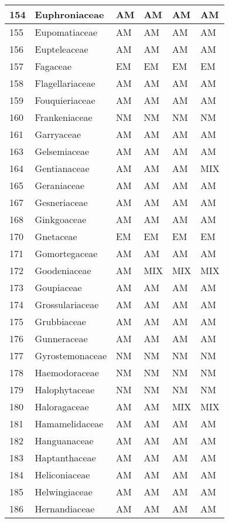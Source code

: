 \documentclass[]{article}
\begin{document}
\begin{longtable}{l|l|l|l|l|l}
\hline
154 & Euphroniaceae & AM & AM & AM & AM\\
\hline
155 & Eupomatiaceae & AM & AM & AM & AM\\
\hline
156 & Eupteleaceae & AM & AM & AM & AM\\
\hline
157 & Fagaceae & EM & EM & EM & EM\\
\hline
158 & Flagellariaceae & AM & AM & AM & AM\\
\hline
159 & Fouquieriaceae & AM & AM & AM & AM\\
\hline
160 & Frankeniaceae & NM & NM & NM & NM\\
\hline
161 & Garryaceae & AM & AM & AM & AM\\
\hline
163 & Gelsemiaceae & AM & AM & AM & AM\\
\hline
164 & Gentianaceae & AM & AM & AM & MIX\\
\hline
165 & Geraniaceae & AM & AM & AM & AM\\
\hline
167 & Gesneriaceae & AM & AM & AM & AM\\
\hline
168 & Ginkgoaceae & AM & AM & AM & AM\\
\hline
170 & Gnetaceae & EM & EM & EM & EM\\
\hline
171 & Gomortegaceae & AM & AM & AM & AM\\
\hline
172 & Goodeniaceae & AM & MIX & MIX & MIX\\
\hline
173 & Goupiaceae & AM & AM & AM & AM\\
\hline
174 & Grossulariaceae & AM & AM & AM & AM\\
\hline
175 & Grubbiaceae & AM & AM & AM & AM\\
\hline
176 & Gunneraceae & AM & AM & AM & AM\\
\hline
177 & Gyrostemonaceae & NM & NM & NM & NM\\
\hline
178 & Haemodoraceae & NM & NM & NM & NM\\
\hline
179 & Halophytaceae & NM & NM & NM & NM\\
\hline
180 & Haloragaceae & AM & AM & MIX & MIX\\
\hline
181 & Hamamelidaceae & AM & AM & AM & AM\\
\hline
182 & Hanguanaceae & AM & AM & AM & AM\\
\hline
183 & Haptanthaceae & AM & AM & AM & AM\\
\hline
184 & Heliconiaceae & AM & AM & AM & AM\\
\hline
185 & Helwingiaceae & AM & AM & AM & AM\\
\hline
186 & Hernandiaceae & AM & AM & AM & AM\\

\end{longtable}
\end{document}
